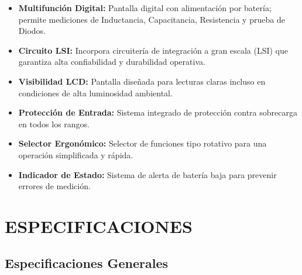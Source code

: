 \documentclass[11pt]{article}
\begin{document}
\begin{itemize}[label=\small\color{IndustrialBlue}$\bullet$, leftmargin=1.2cm, itemsep=5pt]
    \item \textbf{Multifunción Digital:} Pantalla digital con alimentación por batería; permite mediciones de Inductancia, Capacitancia, Resistencia y prueba de Diodos.
    \item \textbf{Circuito LSI:} Incorpora circuitería de integración a gran escala (LSI) que garantiza alta confiabilidad y durabilidad operativa.
    \item \textbf{Visibilidad LCD:} Pantalla diseñada para lecturas claras incluso en condiciones de alta luminosidad ambiental.
    \item \textbf{Protección de Entrada:} Sistema integrado de protección contra sobrecarga en todos los rangos.
    \item \textbf{Selector Ergonómico:} Selector de funciones tipo rotativo para una operación simplificada y rápida.
    \item \textbf{Indicador de Estado:} Sistema de alerta de batería baja para prevenir errores de medición.
\end{itemize}

\section{ESPECIFICACIONES}
\label{sec:specifications}

\subsection{Especificaciones Generales}
\end{document}
